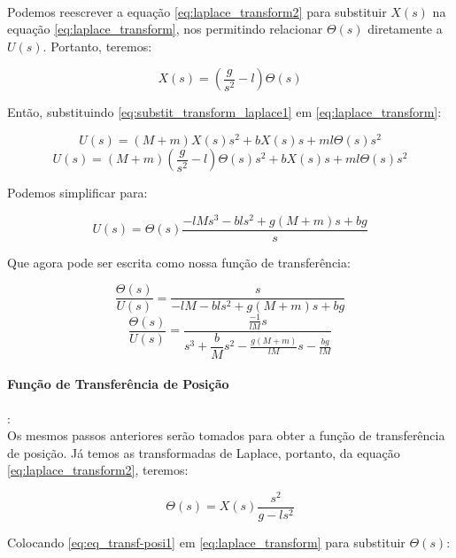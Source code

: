 \documentclass[a4paper, 12pt]{article}
\begin{document}
\\Podemos reescrever a equação \ref{eq:laplace_transform2} para substituir $X(s)$ na equação \ref{eq:laplace_transform}, nos permitindo relacionar $\Theta(s)$ diretamente a $U(s)$. Portanto, teremos:

\begin{equation}\label{eq:substit_transform_laplace1}
    X(s) = (\frac{g}{s^2}-l)\Theta(s)
\end{equation}

Então, substituindo \ref{eq:substit_transform_laplace1} em \ref{eq:laplace_transform}:

\begin{equation}
    U(s) = (M+m)X(s)s^2+bX(s)s+ml\Theta(s)s^2
\end{equation}
\begin{equation}
    U(s) = (M+m)(\frac{g}{s^2}-l)\Theta(s)s^2+bX(s)s+ml\Theta(s)s^2
\end{equation}

Podemos simplificar para:

\begin{equation}
    U(s) = \Theta(s)\frac{-lMs^3-bls^2+g(M+m)s+bg}{s}
\end{equation}

Que agora pode ser escrita como nossa função de transferência:

\begin{equation}
    \frac{\Theta(s)}{U(s)} = \frac{s}{-lM-bls^2+g(M+m)s+bg}
\end{equation}
\begin{equation}\label{eq:tranfer_func_angle}
    \frac{\Theta(s)}{U(s)} = \frac{\frac{-1}{lM}s}{s^3+\dfrac{b}{M}s^2-\frac{g(M+m)}{lM}s-\frac{bg}{lM}}
\end{equation}

\paragraph{Função de Transferência de Posição}:\\

\> Os mesmos passos anteriores serão tomados para obter a função de transferência de posição. Já temos as transformadas de Laplace, portanto, da equação \ref{eq:laplace_transform2}, teremos:

\begin{equation}\label{eq:eq_transf-posi1}
    \Theta(s)=X(s)\frac{s^2}{g-ls^2}
\end{equation}


Colocando \ref{eq:eq_transf-posi1} em \ref{eq:laplace_transform} para substituir $\Theta(s)$:
\end{document}

